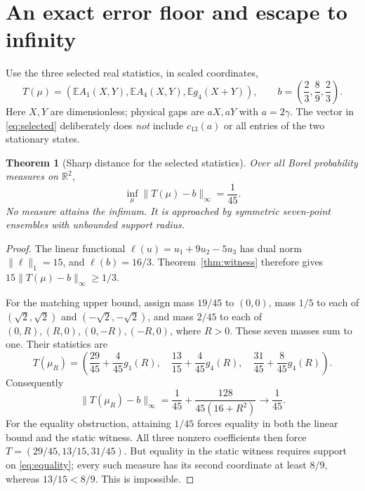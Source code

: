 \documentclass[11pt,a4paper]{article}
\newtheorem{theorem}{Theorem}
\newcommand{\E}{\mathbb E}
\newcommand{\R}{\mathbb R}
\begin{document}
\section{An exact error floor and escape to infinity}
Use the three selected real statistics, in scaled coordinates,
\begin{equation}\label{eq:selected}
 T(\mu)=\left(\E A_1(X,Y),\E A_4(X,Y),\E g_4(X+Y)\right),
 \qquad b=\left(\frac23,\frac89,\frac23\right).
\end{equation}
Here $X,Y$ are dimensionless; physical gaps are $aX,aY$ with
$a=2\gamma$. The vector in \eqref{eq:selected} deliberately does
\emph{not} include $c_{13}(a)$ or all entries of the two stationary
states.

\begin{theorem}[Sharp distance for the selected statistics]\label{thm:distance}
Over all Borel probability measures on $\R^2$,
\begin{equation}\label{eq:distance}
 \inf_\mu\|T(\mu)-b\|_\infty=\frac1{45}.
\end{equation}
No measure attains the infimum. It is approached by symmetric
seven-point ensembles with unbounded support radius.
\end{theorem}
\begin{proof}
The linear functional $\ell(u)=u_1+9u_2-5u_3$ has dual norm
$\|\ell\|_1=15$, and $\ell(b)=16/3$. Theorem~\ref{thm:witness}
therefore gives $15\|T(\mu)-b\|_\infty\geq1/3$.

For the matching upper bound, assign mass $19/45$ to $(0,0)$, mass
$1/5$ to each of $(\sqrt2,\sqrt2)$ and $(-\sqrt2,-\sqrt2)$, and
mass $2/45$ to each of $(0,R),(R,0),(0,-R),(-R,0)$, where $R>0$.
These seven masses sum to one. Their statistics are
\begin{equation}\label{eq:approx}
 T(\mu_R)=
 \left(\frac{29}{45}+\frac4{45}g_1(R),\quad
       \frac{13}{15}+\frac4{45}g_4(R),\quad
       \frac{31}{45}+\frac8{45}g_4(R)\right).
\end{equation}
Consequently
\begin{equation}\label{eq:convergence}
 \|T(\mu_R)-b\|_\infty
 =\frac1{45}+\frac{128}{45(16+R^2)}\longrightarrow\frac1{45}.
\end{equation}
For the equality obstruction, attaining $1/45$ forces equality in
both the linear bound and the static witness. All three nonzero
coefficients then force
$T=(29/45,13/15,31/45)$. But equality in the static witness requires
support on \eqref{eq:equality}; every such measure has its second
coordinate at least $8/9$, whereas $13/15<8/9$. This is impossible.
\end{proof}
\end{document}
